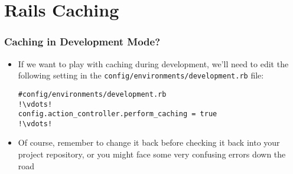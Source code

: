 \documentclass{beamer}
\begin{document}
\section{Rails Caching}
\begin{frame}[fragile]
\frametitle{Caching in Development Mode?}
\begin{itemize}
\item If we want to play with caching during development, we’ll need to edit the following setting in the \texttt{config/environments/development.rb} file:

\lstset{language=Ruby, style=eclipse}
\begin{lstlisting}[escapechar=!]
#config/environments/development.rb
!\vdots!
config.action_controller.perform_caching = true
!\vdots!
\end{lstlisting}

\item Of course, remember to change it back before checking it back into your project repository,
or you might face some very confusing errors down the road
\end{itemize}

\end{frame}
\end{document}
